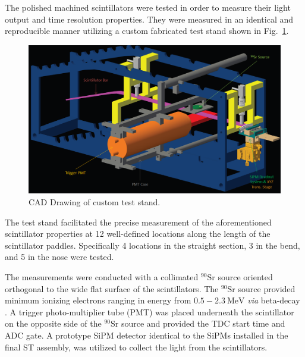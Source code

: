 The polished machined scintillators were tested in order to measure their light output and time resolution properties.  They were measured in an identical and reproducible manner utilizing a custom fabricated test stand shown in Fig.~\ref{fig:test_stand_model}. 
	\begin{figure}[!htb]
		\centering
		\includegraphics[width=1.0\columnwidth]{fabrication/figs/test_stand_model}
		\caption{CAD Drawing of custom test stand.}
		\label{fig:test_stand_model}
	\end{figure}
The test stand facilitated the precise measurement of the aforementioned scintillator properties at 12 well-defined locations along the length of the scintillator paddles.  Specifically 4 locations in the straight section, 3 in the bend, and 5 in the nose were tested.  

The measurements were conducted with a collimated $\mathrm{^{90}Sr}$ source oriented orthogonal to the wide flat surface of the scintillators.  The $\mathrm{^{90}Sr}$ source provided minimum ionizing electrons ranging in energy from $\mathrm{0.5-2.3~MeV}$ \textit{via} beta-decay \cite{nndc_sr90}\cite{nndc_y90}.  A trigger photo-multiplier tube (PMT) was placed underneath the scintillator on the opposite side of the $\mathrm{^{90}Sr}$ source and provided the TDC start time and ADC gate.  A prototype SiPM detector identical to the SiPMs installed in the final ST assembly, was utilized to collect the light from the scintillators.  


